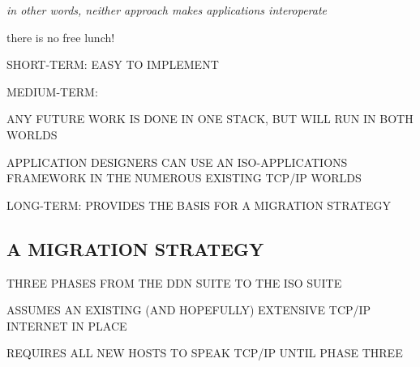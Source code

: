 \begin{note}\em
in other words,
neither approach makes applications interoperate

there is no free lunch!
\end{note}


\begin{bwslide}

\begin{nrtc}
\item	SHORT-TERM: EASY TO IMPLEMENT

\item	MEDIUM-TERM:
    \begin{nrtc}
    \item	ANY FUTURE WORK IS DONE IN ONE STACK, BUT WILL RUN IN BOTH
		WORLDS

    \item	APPLICATION DESIGNERS CAN USE AN ISO-APPLICATIONS\\ FRAMEWORK
		IN THE NUMEROUS EXISTING TCP/IP WORLDS
    \end{nrtc}

\item	LONG-TERM: PROVIDES THE BASIS FOR A MIGRATION STRATEGY
\end{nrtc}
\end{bwslide}


\begin{bwslide}
\part	{A MIGRATION STRATEGY}\bf

\begin{nrtc}
\item	THREE PHASES FROM THE DDN SUITE TO THE ISO SUITE

\item	ASSUMES AN EXISTING (AND HOPEFULLY) EXTENSIVE TCP/IP\\
	INTERNET IN PLACE

\item	REQUIRES ALL NEW HOSTS TO SPEAK TCP/IP UNTIL PHASE THREE

\end{nrtc}
\end{bwslide}


